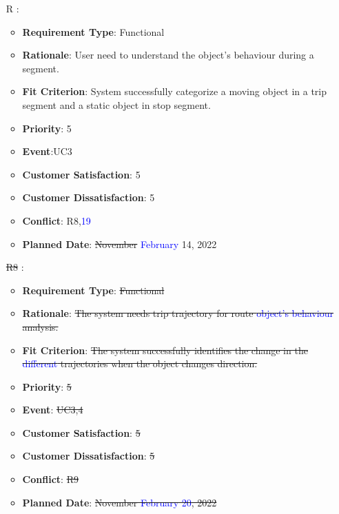 \documentclass[12pt, titlepage]{article}
\newcounter{reqnum} %
\begin{document}
\begin{itemize}
\item[R\refstepcounter{reqnum}\thereqnum
\label{R_Outputs_2}:] 
\begin{itemize}
    \item \textbf{Requirement Type}: Functional
    \item \textbf{Rationale}: User need to understand the object's behaviour during a segment.
    \item \textbf{Fit Criterion}: System successfully categorize a moving object in a trip segment and a static object in stop segment.
    \item \textbf{Priority}: 5
    \item \textbf{Event}:UC3
    \item \textbf{Customer Satisfaction}: 5
    \item \textbf{Customer Dissatisfaction}: 5
    \item \textbf{Conflict}: R8,\textcolor{blue}{19}
    \item \textbf{Planned Date}: \sout{November} \textcolor{blue}{February} 14, 2022
\end{itemize}

\item[\sout{R8}
\label{R_Inputs_1}:] 
\begin{itemize}
    \item \textbf{Requirement Type}: \sout{Functional}
    \item \textbf{Rationale}: \sout{The system needs trip trajectory for route \textcolor{blue}{object's behaviour} analysis. }
    \item \textbf{Fit Criterion}: \sout{The system successfully identifies the \sout{change in the} \textcolor{blue}{different} trajectories when the object changes direction.} 
    \item \textbf{Priority}: \sout{5}
    \item \textbf{Event}: \sout{UC3,4}
    \item \textbf{Customer Satisfaction}: \sout{5}
    \item \textbf{Customer Dissatisfaction}: \sout{5}
    \item \textbf{Conflict}: \sout{R9}
    \item \textbf{Planned Date}: \sout{November \textcolor{blue}{February 20}, 2022}
\end{itemize}


\end{itemize}
\end{document}
